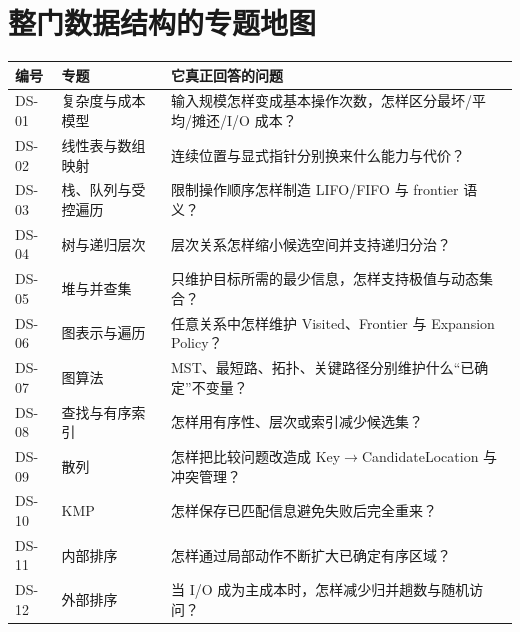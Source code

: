 \documentclass[11pt,a4paper,openany]{ctexbook}
\begin{document}
\section{整门数据结构的专题地图}
\begin{longtable}{L{1.45cm}L{4.4cm}L{\dimexpr\linewidth-7.12cm\relax}}
\toprule
\textbf{编号} & \textbf{专题} & \textbf{它真正回答的问题}\\
\midrule
DS-01 & 复杂度与成本模型 & 输入规模怎样变成基本操作次数，怎样区分最坏/平均/摊还/I/O 成本？\\
DS-02 & 线性表与数组映射 & 连续位置与显式指针分别换来什么能力与代价？\\
DS-03 & 栈、队列与受控遍历 & 限制操作顺序怎样制造 LIFO/FIFO 与 frontier 语义？\\
DS-04 & 树与递归层次 & 层次关系怎样缩小候选空间并支持递归分治？\\
DS-05 & 堆与并查集 & 只维护目标所需的最少信息，怎样支持极值与动态集合？\\
DS-06 & 图表示与遍历 & 任意关系中怎样维护 Visited、Frontier 与 Expansion Policy？\\
DS-07 & 图算法 & MST、最短路、拓扑、关键路径分别维护什么“已确定”不变量？\\
DS-08 & 查找与有序索引 & 怎样用有序性、层次或索引减少候选集？\\
DS-09 & 散列 & 怎样把比较问题改造成 Key$\to$CandidateLocation 与冲突管理？\\
DS-10 & KMP & 怎样保存已匹配信息避免失败后完全重来？\\
DS-11 & 内部排序 & 怎样通过局部动作不断扩大已确定有序区域？\\
DS-12 & 外部排序 & 当 I/O 成为主成本时，怎样减少归并趟数与随机访问？\\
\bottomrule
\end{longtable}
\end{document}
